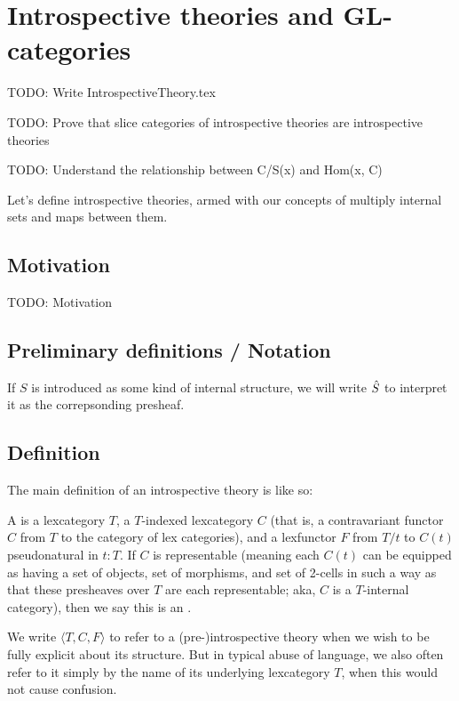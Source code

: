 \section{Introspective theories and GL-categories}

TODO: Write IntrospectiveTheory.tex

TODO: Prove that slice categories of introspective theories are introspective theories

TODO: Understand the relationship between C/S(x) and Hom(x, C)

Let's define introspective theories, armed with our concepts of multiply internal sets and maps between them.

\subsection{Motivation}
TODO: Motivation

\subsection{Preliminary definitions / Notation}
If $S$ is introduced as some kind of internal structure, we will write $\hat{S}$ to interpret it as the correpsonding presheaf.

\subsection{Definition}
The main definition of an introspective theory is like so:
\begin{definition}
A  is a lexcategory $T$, a $T$-indexed lexcategory $C$ (that is, a contravariant functor $C$ from $T$ to the category of lex categories), and a lexfunctor $F$ from $T/t$ to $C(t)$ pseudonatural in $t : T$. If $C$ is representable (meaning each $C(t)$ can be equipped as having a set of objects, set of morphisms, and set of 2-cells in such a way as that these presheaves over $T$ are each representable; aka, $C$ is a $T$-internal category), then we say this is an .
\end{definition}

We write $\langle T, C, F \rangle$ to refer to a (pre-)introspective theory when we wish to be fully explicit about its structure. But in typical abuse of language, we also often refer to it simply by the name of its underlying lexcategory $T$, when this would not cause confusion.

